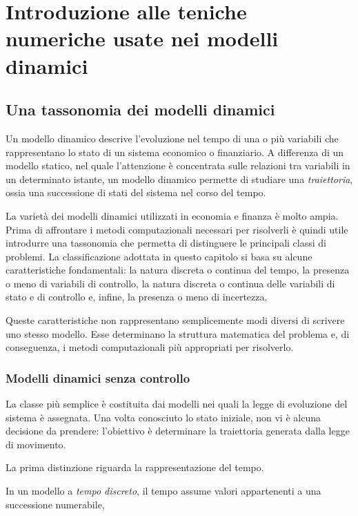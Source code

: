 \documentclass{book}
\begin{document}
\tableofcontents

\chapter{Introduzione alle teniche numeriche usate nei modelli dinamici}

\section{Una tassonomia dei modelli dinamici}

Un modello dinamico descrive l'evoluzione nel tempo di una o più variabili che rappresentano lo stato di un sistema economico o finanziario. A differenza di un modello statico, nel quale l'attenzione è concentrata sulle relazioni tra variabili in un determinato istante, un modello dinamico permette di studiare una \emph{traiettoria}, ossia una successione di stati del sistema nel corso del tempo.

La varietà dei modelli dinamici utilizzati in economia e finanza è molto ampia. Prima di affrontare i metodi computazionali necessari per risolverli è quindi utile introdurre una tassonomia che permetta di distinguere le principali classi di problemi. La classificazione adottata in questo capitolo si basa su alcune caratteristiche fondamentali: la natura discreta o continua del tempo, la presenza o meno di variabili di controllo, la natura discreta o continua delle variabili di stato e di controllo e, infine, la presenza o meno di incertezza.

Queste caratteristiche non rappresentano semplicemente modi diversi di scrivere uno stesso modello. Esse determinano la struttura matematica del problema e, di conseguenza, i metodi computazionali più appropriati per risolverlo.

\subsection{Modelli dinamici senza controllo}

La classe più semplice è costituita dai modelli nei quali la legge di evoluzione del sistema è assegnata. Una volta conosciuto lo stato iniziale, non vi è alcuna decisione da prendere: l'obiettivo è determinare la traiettoria generata dalla legge di movimento.

La prima distinzione riguarda la rappresentazione del tempo.

In un modello a \emph{tempo discreto}, il tempo assume valori appartenenti a una successione numerabile,
\end{document}
